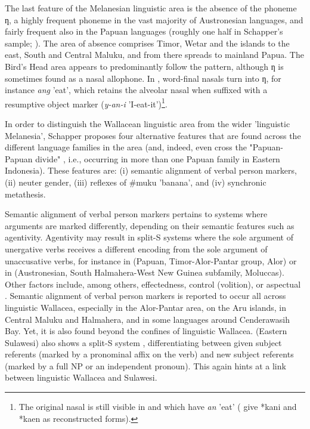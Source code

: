 The last feature of the Melanesian linguistic area is the absence of the phoneme ƞ, a highly frequent phoneme in the vast majority of Austronesian languages, and fairly frequent also in the Papuan languages (roughly one half in Schapper's sample; \citealt[116]{schapper2015wallacea}). The area of absence comprises Timor, Wetar and the islands to the east, South and Central Maluku, and from there spreads to mainland Papua. The Bird's Head area appears to predominantly follow the pattern, although ƞ is sometimes found as a nasal allophone. In , word-final nasals turn into ƞ, for instance \textit{ang} 'eat', which retains the alveolar nasal when suffixed with a resumptive object marker (\textit{y-an-i} 'I-eat-it')\footnote{The original nasal is still visible in  and  which have \textit{an} 'eat' (\citealt{ross2008lexicon} give  *kani and  *kaen as reconstructed forms).}.

In order to distinguish the Wallacean linguistic area from the wider 'linguistic Melanesia', Schapper proposes four alternative features that are found across the different language families in the area (and, indeed, even cross the "Papuan-Papuan divide" \citep[124]{schapper2015wallacea}, i.e., occurring in more than one Papuan family in Eastern Indonesia). These features are: (i) semantic alignment of verbal person markers, (ii) neuter gender, (iii) reflexes of \#muku 'banana', and (iv) synchronic metathesis.

Semantic alignment of verbal person markers pertains to systems where arguments are marked differently, depending on their semantic features such as agentivity. Agentivity may result in split-S systems where the sole argument of unergative verbs receives a different encoding from the sole argument of unaccusative verbs, for instance in  (Papuan, Timor-Alor-Pantar group, Alor) or in  (Austronesian, South Halmahera-West New Guinea subfamily, Moluccas). Other factors include, among others, effectedness, control (volition), or aspectual \citep[125]{schapper2015wallacea}. Semantic alignment of verbal person markers is reported to occur all across linguistic Wallacea, especially in the Alor-Pantar area, on the Aru islands, in Central Maluku and Halmahera, and in some languages around Cenderawasih Bay. Yet, it is also found beyond the confines of linguistic Wallacea.  (Eastern Sulawesi) also shows a split-S system \citep{Barsel1994}, differentiating between given subject referents (marked by a pronominal affix on the verb) and new subject referents (marked by a full NP or an independent pronoun). This again hints at a link between linguistic Wallacea and Sulawesi.


